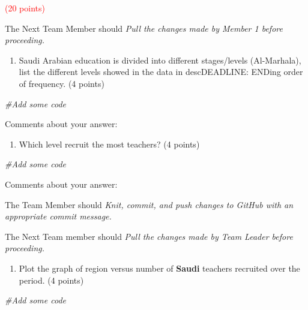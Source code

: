 \documentclass[
]{article}
\newenvironment{Shaded}{\begin{snugshade}}{\end{snugshade}}
\newcommand{\CommentTok}[1]{\textcolor[rgb]{0.56,0.35,0.01}{\textit{#1}}}
\providecommand{\tightlist}{%
  \setlength{\itemsep}{0pt}\setlength{\parskip}{0pt}}
\begin{document}
\textcolor{red}{(20 points)}

The Next Team Member should \emph{Pull the changes made by Member 1
before proceeding.}

\begin{enumerate}
\def\labelenumi{(\alph{enumi})}
\tightlist
\item
  Saudi Arabian education is divided into different stages/levels
  (Al-Marhala), list the different levels showed in the data in
  descDEADLINE: ENDing order of frequency. (4 points)
\end{enumerate}

\begin{Shaded}
\begin{Highlighting}[]
\CommentTok{\#Add some code}
\end{Highlighting}
\end{Shaded}

Comments about your answer:

\begin{enumerate}
\def\labelenumi{(\alph{enumi})}
\setcounter{enumi}{1}
\tightlist
\item
  Which level recruit the most teachers? (4 points)
\end{enumerate}

\begin{Shaded}
\begin{Highlighting}[]
\CommentTok{\#Add some code}
\end{Highlighting}
\end{Shaded}

Comments about your answer:

The Team Member should \emph{Knit, commit, and push changes to GitHub
with an appropriate commit message.}

The Next Team member should \emph{Pull the changes made by Team Leader
before proceeding.}

\begin{enumerate}
\def\labelenumi{(\alph{enumi})}
\setcounter{enumi}{2}
\tightlist
\item
  Plot the graph of region versus number of \textbf{Saudi} teachers
  recruited over the period. (4 points)
\end{enumerate}

\begin{Shaded}
\begin{Highlighting}[]
\CommentTok{\#Add some code}
\end{Highlighting}
\end{Shaded}
\end{document}
